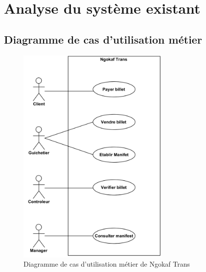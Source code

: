     \section[Analyse du système existant]{Analyse du système existant}
        \subsection[Diagramme de cas d’utilisation métier]{Diagramme de cas d’utilisation métier}
        \begin{figure}[H]
            \centering
            \includegraphics[width=75mm]{images/diagramme-de-cu/Systeme Existant.png}
            \caption{Diagramme de cas d’utilisation métier de Ngokaf Trans}
            \label{fig:DcuNgokaf}
        \end{figure}
\pagebreak
